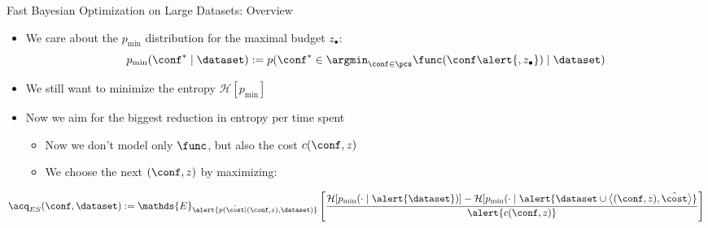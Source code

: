 \begin{frame}[c]{Fast Bayesian Optimization on Large Datasets: Overview}

\begin{itemize}
		\item We care about the $p_{\text{min}}$ distribution for the maximal budget $z_{\bullet}$:
		$$p_{\text{min}}(\conf^* \mid \dataset) := p(\conf^* \in \argmin_{\conf\in \pcs} \func(\conf\alert{,z_{\bullet}}) \mid \dataset)$$
	
		\item We still want to minimize the entropy $\mathcal{H}[p_\text{min}]$
\pause
		\item Now we aim for the biggest \alert{reduction in entropy per time spent}
		\begin{itemize}
			\item Now we don't model only $\func$, but also \alert{the cost $c(\conf,z)$}
			\item We choose the next $(\conf,z)$ by maximizing:
		\end{itemize}
\end{itemize}
\vspace*{0.5cm}
	\[{\acq}_{ES}(\conf,\dataset) := \mathds{E}_{\alert{p(\tilde{\cost}\mid (\conf, z), \dataset)}} 
	\left[   \frac{\mathcal{H}[p_{\text{min}}(\cdot \mid \alert{\dataset})] - \mathcal{H}[p_{\text{min}}(\cdot \mid \alert{\dataset \cup \left\langle (\conf,z), \tilde{\cost} \right\rangle}}{\alert{c(\conf,z)}} \right]\]

\end{frame}

